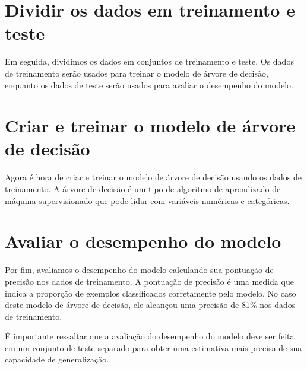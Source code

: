 \documentclass{article}
\begin{document}
\section{Dividir os dados em treinamento e teste}
Em seguida, dividimos os dados em conjuntos de treinamento e teste. Os dados de treinamento serão usados para treinar o modelo de árvore de decisão, enquanto os dados de teste serão usados para avaliar o desempenho do modelo.

\section{Criar e treinar o modelo de árvore de decisão}
Agora é hora de criar e treinar o modelo de árvore de decisão usando os dados de treinamento. A árvore de decisão é um tipo de algoritmo de aprendizado de máquina supervisionado que pode lidar com variáveis numéricas e categóricas.

\section{Avaliar o desempenho do modelo}
Por fim, avaliamos o desempenho do modelo calculando sua pontuação de precisão nos dados de treinamento. A pontuação de precisão é uma medida que indica a proporção de exemplos classificados corretamente pelo modelo. No caso deste modelo de árvore de decisão, ele alcançou uma precisão de 81\% nos dados de treinamento.

É importante ressaltar que a avaliação do desempenho do modelo deve ser feita em um conjunto de teste separado para obter uma estimativa mais precisa de sua capacidade de generalização.



\end{document}
